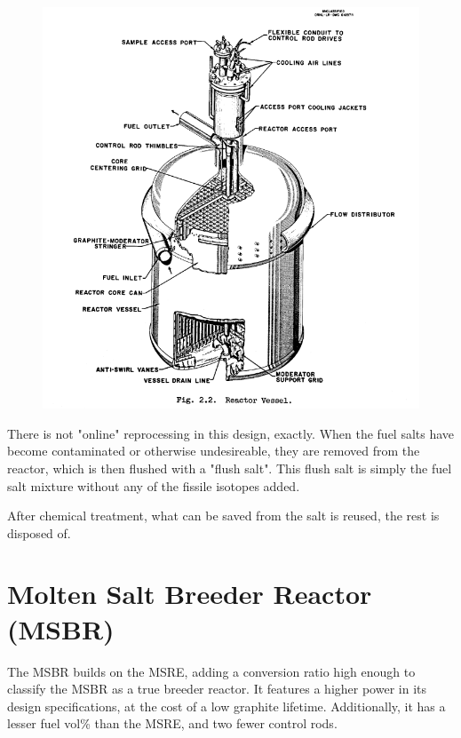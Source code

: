 \documentclass[letterpaper]{article}
\begin{document}
\begin{figure}[H]
  \centering
  \includegraphics[width=1.0\linewidth]{figures/MSREsource2.png}
  \label{fig:fig2}
\end{figure}

There is not "online" reprocessing in this design, exactly.  When the fuel salts have become contaminated or otherwise undesireable, they are removed from the reactor, which is then flushed with a "flush salt".  This flush salt is simply the fuel salt mixture without any of the fissile isotopes added.

After chemical treatment, what can be saved from the salt is reused, the rest is disposed of.

\section{Molten Salt Breeder Reactor (MSBR)}
The MSBR builds on the MSRE, adding a conversion ratio high enough to classify the MSBR as a true breeder reactor.  It features a higher power in its design specifications, at the cost of a low graphite lifetime.  Additionally, it has a lesser fuel vol\% than the MSRE, and two fewer control rods.
\end{document}
